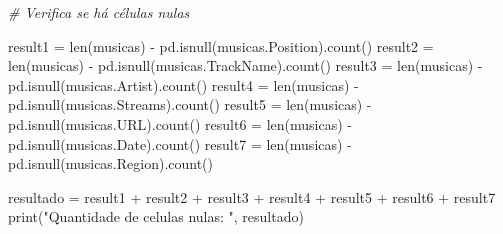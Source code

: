 \documentclass[11pt]{article}
\newenvironment{Shaded}{}{}
\newcommand{\StringTok}[1]{\textcolor[rgb]{0.25,0.44,0.63}{{#1}}}
\newcommand{\CommentTok}[1]{\textcolor[rgb]{0.38,0.63,0.69}{\textit{{#1}}}}
\newcommand{\NormalTok}[1]{{#1}}
\newcommand{\OperatorTok}[1]{\textcolor[rgb]{0.40,0.40,0.40}{{#1}}}
\newcommand{\BuiltInTok}[1]{{#1}}
\begin{document}
    \begin{Shaded}
\begin{Highlighting}[]
    \CommentTok{# Verifica se há células nulas}

\NormalTok{result1 }\OperatorTok{=} \BuiltInTok{len}\NormalTok{(musicas) }\OperatorTok{-}\NormalTok{ pd.isnull(musicas.Position).count()}
\NormalTok{result2 }\OperatorTok{=} \BuiltInTok{len}\NormalTok{(musicas) }\OperatorTok{-}\NormalTok{ pd.isnull(musicas.TrackName).count()}
\NormalTok{result3 }\OperatorTok{=} \BuiltInTok{len}\NormalTok{(musicas) }\OperatorTok{-}\NormalTok{ pd.isnull(musicas.Artist).count()}
\NormalTok{result4 }\OperatorTok{=} \BuiltInTok{len}\NormalTok{(musicas) }\OperatorTok{-}\NormalTok{ pd.isnull(musicas.Streams).count()}
\NormalTok{result5 }\OperatorTok{=} \BuiltInTok{len}\NormalTok{(musicas) }\OperatorTok{-}\NormalTok{ pd.isnull(musicas.URL).count()}
\NormalTok{result6 }\OperatorTok{=} \BuiltInTok{len}\NormalTok{(musicas) }\OperatorTok{-}\NormalTok{ pd.isnull(musicas.Date).count()}
\NormalTok{result7 }\OperatorTok{=} \BuiltInTok{len}\NormalTok{(musicas) }\OperatorTok{-}\NormalTok{ pd.isnull(musicas.Region).count()}

\NormalTok{resultado }\OperatorTok{=}\NormalTok{ result1 }\OperatorTok{+}\NormalTok{ result2 }\OperatorTok{+}\NormalTok{ result3 }\OperatorTok{+}\NormalTok{ result4 }\OperatorTok{+}\NormalTok{ result5 }\OperatorTok{+}\NormalTok{ result6 }\OperatorTok{+}\NormalTok{ result7}
\BuiltInTok{print}\NormalTok{(}\StringTok{"Quantidade de celulas nulas: "}\NormalTok{, resultado)}
\end{Highlighting}
\end{Shaded}
\end{document}
